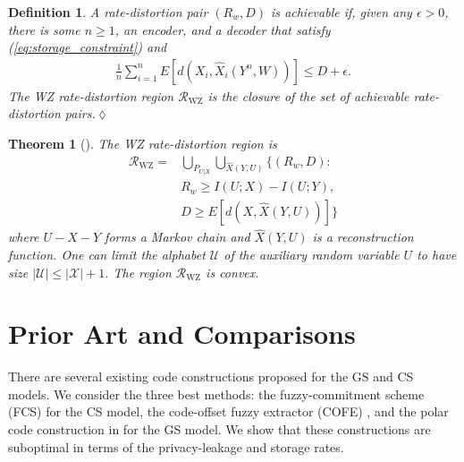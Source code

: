 \documentclass[journal,10pt,twoside]{IEEEtran}
\newtheorem{theorem}{Theorem}
\newtheorem{definition}{Definition}
\begin{document}
 
 
\begin{definition}\label{def:WZdefinition}
	 A rate-distortion pair $(R_w,D)$ is \emph{achievable} if, given any $\epsilon>0$, there is some $n\geq 1$, an encoder, and a decoder that satisfy (\ref{eq:storage_constraint}) and
	\begin{align}
	\frac{1}{n}\sum_{i=1}^nE[d(X_i, \widehat{X}_i(Y^n,W))]\leq D+\epsilon \label{eq:WZdistortion}.
	\end{align}
	The WZ rate-distortion region $\mathcal{R}_{\text{WZ}}$ is the closure of the set of achievable rate-distortion pairs.\hfill $\lozenge$
\end{definition}

\begin{theorem}[\hspace{1sp}\cite{WZratedistortion}]\label{theo:WZ}
	The WZ rate-distortion region is 
	\begin{align}
	\mathcal{R}_{\text{WZ}}\! =\! &\bigcup_{P_{U|X}}\bigcup_{\widehat{X}(Y,U)}\!\Big\{\left(R_w,D\right)\!\colon\nonumber\\
	&R_w\geq I(U;X)-I(U;Y),\nonumber\\
	&D\geq E[d(X, \widehat{X}(Y,U))]\Big\} \label{eq:WZrateregion}
	\end{align}
	where $U-X-Y$ forms a Markov chain and $\widehat{X}(Y,U)$ is a reconstruction function. One can limit the alphabet $\mathcal{U}$ of the auxiliary random variable $U$ to have size $\displaystyle |\mathcal{U}|\!\leq\!|\mathcal{X}|+1$. The region $\mathcal{R}_{\text{WZ}}$ is convex.
\end{theorem}


\section{Prior Art and Comparisons}\label{sec:CompareMethods}
There are several existing code constructions proposed for the GS and CS models. We consider the three best methods: the fuzzy-commitment scheme (FCS) \cite{FuzzyCommitment} for the CS model, the code-offset fuzzy extractor (COFE) \cite{Dodis2008fuzzy}, and the polar code construction in \cite{IgnaPolar} for the GS model. We show that these constructions are suboptimal in terms of the privacy-leakage and storage rates. 
\end{document}

